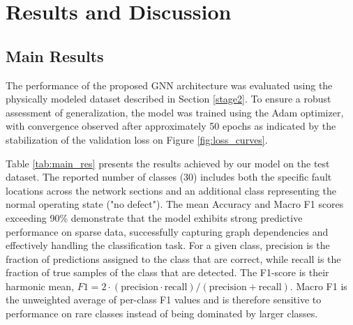 \documentclass[energies,article,submit,pdftex,moreauthors]{Definitions/mdpi}
\newif\ifshowrevisions
\newcommand{\revisionstyle}[1]{\textcolor{blue}{#1}}
\newcommand{\revision}[1]{\ifshowrevisions\revisionstyle{#1}\else#1\fi}
\begin{document}
\section{Results and Discussion}

\subsection{Main Results}
The performance of the proposed GNN architecture was evaluated using the
physically modeled dataset described in Section \ref{stage2}. To ensure a
robust assessment of generalization, the model was trained using the Adam
optimizer, with convergence observed after approximately 50 epochs as indicated
by the stabilization of the validation loss on Figure \ref{fig:loss_curves}.

Table \ref{tab:main_res} presents the results achieved by our model on the test
dataset. The reported number of classes (30) includes both the specific fault
locations across the network sections and an additional class representing the
normal operating state ("no defect"). The mean Accuracy and Macro F1 scores
exceeding 90\% demonstrate that the model exhibits strong predictive
performance on sparse data, successfully capturing graph dependencies and
effectively handling the classification task. 
For a given
	class, precision is the fraction of predictions assigned to the class that
	are correct, while recall is the fraction of true samples of the class that
	are detected. The F1-score is their harmonic mean,
	$F1=2\cdot(\mathrm{precision}\cdot\mathrm{recall})/
		(\mathrm{precision}+\mathrm{recall})$. Macro F1 is the unweighted average
	of per-class F1 values and is therefore sensitive to performance on rare
	classes instead of being dominated by larger classes.
\end{document}
